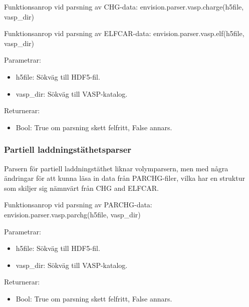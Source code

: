 \documentclass[a4paper,12pt]{article}
\begin{document}
Funktionsanrop vid parsning av CHG-data: envision.parser.vasp.charge(h5file, vasp\_dir)

Funktionsanrop vid parsning av ELFCAR-data: envision.parser.vasp.elf(h5file, vasp\_dir)

Parametrar:
\begin{itemize}
\setlength\itemsep{0em}
\item h5file: Sökväg till HDF5-fil.
\item vasp\_dir: Sökväg till VASP-katalog.
\end{itemize}

Returnerar:
\begin{itemize}
\setlength\itemsep{0em}
\item Bool: True om parsning skett felfritt, False annars.
\end{itemize}

\subsubsection{Partiell laddningstäthetsparser}

Parsern för partiell laddningstäthet liknar volymparsern, men med några ändringar för att kunna läsa in data från PARCHG-filer, vilka har en struktur som skiljer sig nämnvärt från CHG and ELFCAR. 

Funktionsanrop vid parsning av PARCHG-data: envision.parser.vasp.parchg(h5file, vasp\_dir)

Parametrar:
\begin{itemize}
\setlength\itemsep{0em}
\item h5file: Sökväg till HDF5-fil.
\item vasp\_dir: Sökväg till VASP-katalog.
\end{itemize}

Returnerar:
\begin{itemize}
\setlength\itemsep{0em}
\item Bool: True om parsning skett felfritt, False annars.
\end{itemize}
\end{document}
